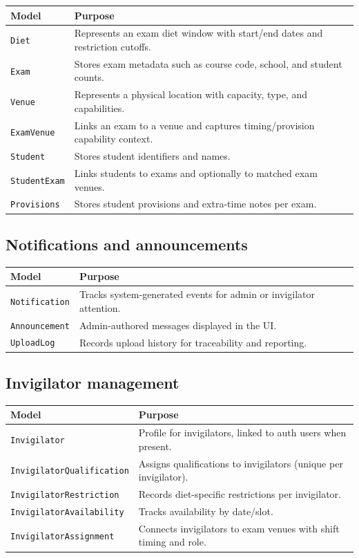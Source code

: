 \begin{longtable}{p{}p{}}
\toprule
\textbf{Model} & \textbf{Purpose} \\
\midrule
\texttt{Diet} & Represents an exam diet window with start/end dates and restriction cutoffs. \\
\texttt{Exam} & Stores exam metadata such as course code, school, and student counts. \\
\texttt{Venue} & Represents a physical location with capacity, type, and capabilities. \\
\texttt{ExamVenue} & Links an exam to a venue and captures timing/provision capability context. \\
\texttt{Student} & Stores student identifiers and names. \\
\texttt{StudentExam} & Links students to exams and optionally to matched exam venues. \\
\texttt{Provisions} & Stores student provisions and extra-time notes per exam. \\
\bottomrule
\end{longtable}

\subsection{Notifications and announcements}
\label{subsec:models:notifications}

\begin{longtable}{p{}p{}}
\toprule
\textbf{Model} & \textbf{Purpose} \\
\midrule
\texttt{Notification} & Tracks system-generated events for admin or invigilator attention. \\
\texttt{Announcement} & Admin-authored messages displayed in the UI. \\
\texttt{UploadLog} & Records upload history for traceability and reporting. \\
\bottomrule
\end{longtable}

\subsection{Invigilator management}
\label{subsec:models:invigilators}

\begin{longtable}{p{}p{}}
\toprule
\textbf{Model} & \textbf{Purpose} \\
\midrule
\texttt{Invigilator} & Profile for invigilators, linked to auth users when present. \\
\texttt{InvigilatorQualification} & Assigns qualifications to invigilators (unique per invigilator). \\
\texttt{InvigilatorRestriction} & Records diet-specific restrictions per invigilator. \\
\texttt{InvigilatorAvailability} & Tracks availability by date/slot. \\
\texttt{InvigilatorAssignment} & Connects invigilators to exam venues with shift timing and role. \\
\bottomrule
\end{longtable}

